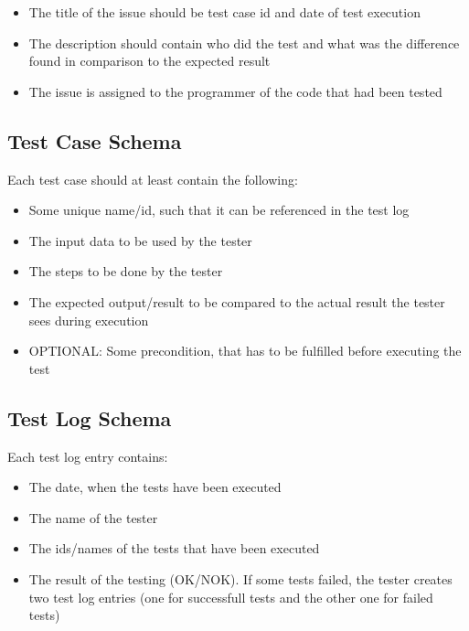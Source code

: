 \documentclass[twoside,12pt,a4paper]{article}
\begin{document}
\begin{itemize}
  \item The title of the issue should be test case id and date of test execution
  \item The description should contain who did the test and what was the difference found in comparison to the expected result
  \item The issue is assigned to the programmer of the code that had been tested
\end{itemize}


\subsection{Test Case Schema} %
\label{sub:test_case_schema}

Each test case should at least contain the following:
\begin{itemize}
  \item Some unique name/id, such that it can be referenced in the test log
  \item The input data to be used by the tester
  \item The steps to be done by the tester
  \item The expected output/result to be compared to the actual result the tester sees during execution
  \item OPTIONAL: Some precondition, that has to be fulfilled before executing 
the test
\end{itemize}


\subsection{Test Log Schema} %
\label{sub:test_log_schema}

Each test log entry contains:
\begin{itemize}
  \item The date, when the tests have been executed
  \item The name of the tester
  \item The ids/names of the tests that have been executed
  \item The result of the testing (OK/NOK). If some tests failed, the tester creates two test log entries (one for successfull tests and the other one for failed tests)
\end{itemize}
\end{document}
